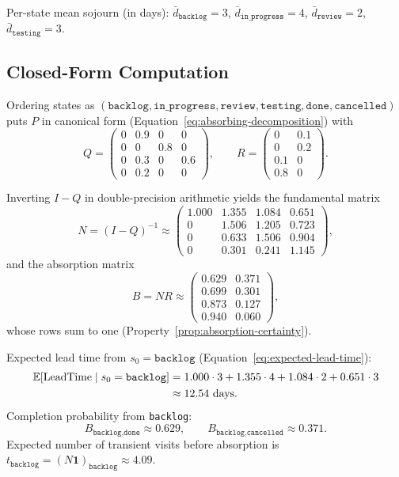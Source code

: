 Per-state mean sojourn (in days):
$\bar{d}_{\texttt{backlog}} = 3$,
$\bar{d}_{\texttt{in\_progress}} = 4$,
$\bar{d}_{\texttt{review}} = 2$,
$\bar{d}_{\texttt{testing}} = 3$.

\subsection{Closed-Form Computation}
\label{sec:num-analytical}

Ordering states as $(\texttt{backlog}, \texttt{in\_progress},
\texttt{review}, \texttt{testing}, \texttt{done}, \texttt{cancelled})$
puts $P$ in canonical form (Equation~\ref{eq:absorbing-decomposition})
with
\[
Q = \begin{pmatrix}
0 & 0.9 & 0   & 0   \\
0 & 0   & 0.8 & 0   \\
0 & 0.3 & 0   & 0.6 \\
0 & 0.2 & 0   & 0
\end{pmatrix}, \qquad
R = \begin{pmatrix}
0    & 0.1 \\
0    & 0.2 \\
0.1  & 0   \\
0.8  & 0
\end{pmatrix}.
\]

Inverting $I-Q$ in double-precision arithmetic yields the fundamental
matrix
\[
N = (I - Q)^{-1} \approx
\begin{pmatrix}
1.000 & 1.355 & 1.084 & 0.651 \\
0     & 1.506 & 1.205 & 0.723 \\
0     & 0.633 & 1.506 & 0.904 \\
0     & 0.301 & 0.241 & 1.145
\end{pmatrix},
\]
and the absorption matrix
\[
B = N R \approx
\begin{pmatrix}
0.629 & 0.371 \\
0.699 & 0.301 \\
0.873 & 0.127 \\
0.940 & 0.060
\end{pmatrix},
\]
whose rows sum to one (Property~\ref{prop:absorption-certainty}).

Expected lead time from $s_0 = \texttt{backlog}$
(Equation~\ref{eq:expected-lead-time}):
\begin{align}
\label{eq:num-lead}
\mathbb{E}[\text{LeadTime} \mid s_0 = \texttt{backlog}]
  &= 1.000 \cdot 3 + 1.355 \cdot 4 + 1.084 \cdot 2 + 0.651 \cdot 3 \notag \\
  &\approx 12.54 \text{ days.}
\end{align}
Completion probability from \texttt{backlog}:
\begin{equation}
\label{eq:num-completion}
B_{\texttt{backlog},\texttt{done}} \approx 0.629,
\qquad
B_{\texttt{backlog},\texttt{cancelled}} \approx 0.371.
\end{equation}
Expected number of transient visits before absorption is
$t_{\texttt{backlog}} = (N \mathbf{1})_{\texttt{backlog}}
\approx 4.09$.

